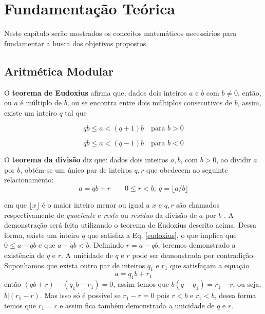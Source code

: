 \chapter{Fundamentação Teórica}
Neste capítulo serão mostrados os conceitos matemáticos necessários para fundamentar a busca dos objetivos propostos.

%
%
\section{Aritmética Modular}

O \textbf{teorema de Eudoxius} afirma que, dados dois inteiros \(a\) e \(b\) com \(b \neq 0\), então, ou \(a\) é múltiplo de \(b\), ou se encontra entre dois múltiplos 
consecutivos de \(b\), assim, existe um inteiro \(q\) tal que \cite{Santos:2014}

\begin{equation} \label{eudoxius}
  qb \leq a < (q + 1)b\quad\mbox{para \(b > 0\)}
\end{equation}

\begin{equation}
  qb \leq a < (q - 1)b\quad\mbox{para \(b < 0\)}
\end{equation}

O \textbf{teorema da divisão} diz que: dados dois inteiros $a, b$, com $b > 0$, ao dividir \(a\) por \(b\), obtém-se um único par de inteiros $q, r$ que obedecem ao seguinte relacionamento:
\begin{equation}
  a=qb+r \qquad 0 \leq r<b;\ q=\lfloor a/b \rfloor
\end{equation}

em que $\lfloor x \rfloor$ é o maior inteiro menor ou igual a \(x\) e $q,r$ são chamados respectivamente de \textit{quociente} e \textit{resto} ou \textit{resíduo} da divisão de \(a\) por \(b\) \cite{Santos:2014}. A demonstração será feita utilizando o teorema de Eudoxius descrito acima. Dessa forma, existe um inteiro \(q\) que satisfaz a Eq. \ref{eudoxius}, o que implica que \(0 \leq a - qb\) e que \(a - qb < b\). Definindo \(r = a - qb\), teremos demonstrado a existência de \(q\) e \(r\). A unicidade de \(q\) e 
\(r\) pode ser demonstrada por contradição. Suponhamos que exista outro par de inteiros \(q_1\) e \(r_1\) que satisfaçam a equação
\begin{equation}
  a = q_1b + r_1
\end{equation}
então \((qb + r) - (q_1b - r_1) = 0\), assim temos que \(b(q - q_1) = r_1 - r\), ou seja, \(b|(r_1 - r)\). Mas isso só é possível se \(r_1 - r = 0\) 
pois \(r < b\) e \(r_1 < b\), dessa forma temos que \(r_1 = r\) 
e assim fica também demonstrada a unicidade de \(q\) e \(r\). \cite{Santos:2014}


